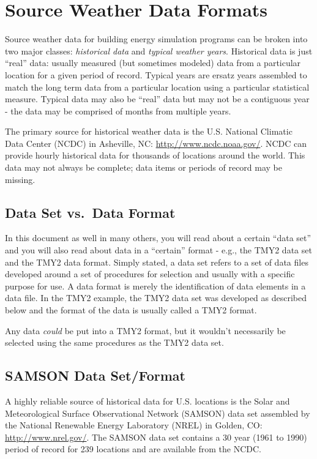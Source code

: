 \section{Source Weather Data Formats}\label{source-weather-data-formats}

Source weather data for building energy simulation programs can be broken into two major classes: \emph{historical data} and \emph{typical weather years}. Historical data is just ``real'' data: usually measured (but sometimes modeled) data from a particular location for a given period of record. Typical years are ersatz years assembled to match the long term data from a particular location using a particular statistical measure. Typical data may also be ``real'' data but may not be a contiguous year - the data may be comprised of months from multiple years.

The primary source for historical weather data is the U.S. National Climatic Data Center (NCDC) in Asheville, NC: \url{http://www.ncdc.noaa.gov/}. NCDC can provide hourly historical data for thousands of locations around the world. This data may not always be complete; data items or periods of record may be missing.

\subsection{Data Set vs.~Data Format}\label{data-set-vs.data-format}

In this document as well in many others, you will read about a certain ``data set'' and you will also read about data in a ``certain'' format - e.g., the TMY2 data set and the TMY2 data format. Simply stated, a data set refers to a set of data files developed around a set of procedures for selection and usually with a specific purpose for use. A data format is merely the identification of data elements in a data file. In the TMY2 example, the TMY2 data set was developed as described below and the format of the data is usually called a TMY2 format.

Any data \emph{could} be put into a TMY2 format, but it wouldn't necessarily be selected using the same procedures as the TMY2 data set.

\subsection{SAMSON Data Set/Format}\label{samson-data-setformat}

A highly reliable source of historical data for U.S. locations is the Solar and Meteorological Surface Observational Network (SAMSON) data set assembled by the National Renewable Energy Laboratory (NREL) in Golden, CO: \url{http://www.nrel.gov/}. The SAMSON data set contains a 30 year (1961 to 1990) period of record for 239 locations and are available from the NCDC.

